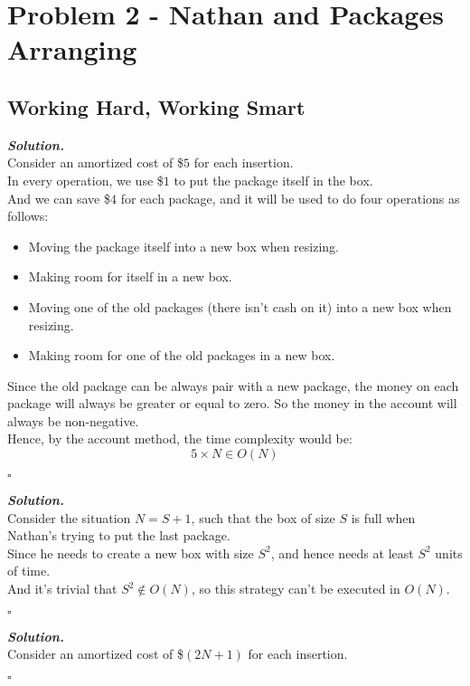 \documentclass[12pt, a4paper, UTF8]{article}
\newenvironment{solution}[1][\it{Solution}]{\textbf{#1. }\\}{\begin{flushright}$\square$\end{flushright}}
\begin{document}
\section*{Problem 2 - Nathan and Packages Arranging}
\begin{subprobs}
\subsection*{Working Hard, Working Smart}
\item  
    \begin{solution}
        Consider an amortized cost of \$$5$ for each insertion.\\
        In every operation, we use \$$1$ to put the package itself in the box.\\
        And we can save \$$4$ for each package, and it will be used to do four operations as follows:
        \begin{itemize}
            \item Moving the package itself into a new box when resizing.
            \item Making room for itself in a new box.
            \item Moving one of the old packages (there isn't cash on it) into a new box when resizing.
            \item Making room for one of the old packages in a new box.
        \end{itemize}
        Since the old package can be always pair with a new package, the money on each package will always be greater or equal to zero. So the money in the account will always be non-negative.\\
        Hence, by the account method, the time complexity would be:
        $$5 \times N \in O(N)$$ 
    \end{solution}
\item
    \begin{solution}
        Consider the situation $N = S + 1$, such that the box of size $S$ is full when Nathan's trying to put the last package.\\
        Since he needs to create a new box with size $S^{2}$, and hence needs at least $S^{2}$ units of time.\\
        And it's trivial that $S^{2} \not\in O(N)$, so this strategy can't be executed in $O(N)$.
    \end{solution}
\item
    \begin{solution}
        Consider an amortized cost of \$$(2N + 1)$ for each insertion.\\

\end{solution}
\end{subprobs}
\end{document}
